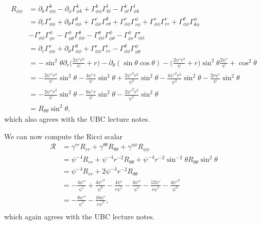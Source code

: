 \documentclass[12pt]{article}
\numberwithin{equation}{section}
\begin{document}
\begin{equation}
\begin{aligned}
R_{\phi \phi} &= \partial_k \Gamma^k_{\phi \phi} - \partial_\phi \Gamma^k_{\phi k} + \Gamma^k_{\phi \phi} \Gamma^l_{kl} - \Gamma^k_{\phi l} \Gamma^l_{\phi k} \\
&= \partial_r \Gamma^r_{\phi \phi} + \partial_\theta \Gamma^\theta_{\phi \phi} + \Gamma^r_{\phi \phi} \Gamma^\theta_{r\theta} + \Gamma^r_{\phi \phi} \Gamma^\phi_{r\phi} + \Gamma^r_{\phi \phi} \Gamma^r_{r r} + \Gamma^\theta_{\phi \phi} \Gamma^\phi_{\theta \phi} \\
&- \Gamma^r_{\phi \phi} \Gamma^\phi_{\phi r} - \Gamma^\phi_{\phi \theta} \Gamma^\theta_{\phi \phi} - \Gamma^\theta_{\phi \phi} \Gamma^\phi_{\phi \theta} - \Gamma^\phi_{\phi r} \Gamma^{r}_{\phi \phi} \\
&= \partial_r \Gamma^r_{\phi \phi} + \partial_\theta \Gamma^\theta_{\phi \phi} + \Gamma^r_{\phi \phi} \Gamma^r_{r r} - \Gamma^\theta_{\phi \phi} \Gamma^\phi_{\phi \theta} \\
&= - \sin^2 \theta \partial_r \Big( \frac{2 \psi' r^2}{\psi} + r \Big) - \partial_\theta (\sin \theta \cos \theta) - \Big( \frac{2 \psi' r^2}{\psi} + r \Big) \sin^2 \theta \frac{2 \psi'}{\psi} + \cos^2 \theta \\
&= - \frac{2 \psi'' r^2}{\psi} \sin^2 \theta - \frac{4 \psi' r}{\psi} \sin^2 \theta + \frac{2 \psi'^2 r^2}{\psi^2} \sin^2 \theta - \frac{4 \psi'^2 r^2}{\psi^2} \sin^2 \theta - \frac{2 r \psi'}{\psi} \sin^2 \theta \\
&= - \frac{2 \psi'' r^2}{\psi} \sin^2 \theta - \frac{6 \psi' r}{\psi} \sin^2 \theta - \frac{2 \psi'^2 r^2}{\psi^2} \sin^2 \theta \\
&= R_{\theta \theta} \sin^2 \theta,
\end{aligned}
\end{equation}
which also agrees with the UBC lecture notes.

We can now compute the Ricci scalar
\begin{equation}
\begin{aligned}
\mathcal{R} &= \gamma^{r r} R_{r r} + \gamma^{\theta \theta} R_{\theta \theta} + \gamma^{\phi \phi} R_{\phi \phi} \\
&= \psi^{-4} R_{rr} + \psi^{-4} r^{-2} R_{\theta \theta} + \psi^{-4} r^{-2} \sin^{-2} \theta R_{\theta \theta} \sin^2 \theta \\
&= \psi^{-4} R_{rr} + 2 \psi^{-4} r^{-2} R_{\theta \theta} \\
&= - \frac{4 \psi''}{\psi^5} + \frac{4 \psi'^2}{\psi^6} - \frac{4 \psi'}{r \psi^5} - \frac{4 \psi''}{\psi^5} - \frac{12 \psi'}{r \psi^5} - \frac{4 \psi'^2}{\psi^6} \\
&= - \frac{8 \psi''}{\psi^5} - \frac{16 \psi'}{r \psi^5}, \\
\end{aligned}
\end{equation}
which again agrees with the UBC lecture notes.
\end{document}
